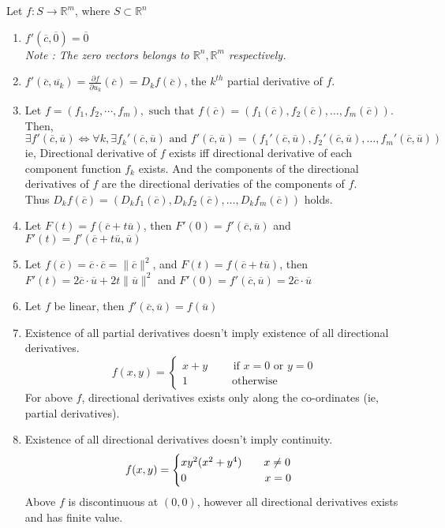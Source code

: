 \begin{remark}[Properties] Let \(f : S \to \mathbb{R}^m \), where \( S \subset \mathbb{R}^n\)
	\begin{enumerate}
		\item \( f'(\overline{c},\overline{0}) = \overline{0} \)\\
			\textsl{Note : The zero vectors belongs to $\mathbb{R}^n, \mathbb{R}^m$ respectively.}
		\item \( f'(\overline{c},\overline{u_k}) = \frac{\partial f}{\partial u_k}(\overline{c}) = D_k f(\overline{c}) \), the $k^{th}$ partial derivative of $f$.
		\item Let \( f = (f_1, f_2, \cdots, f_m), \text{ such that } f(\overline{c}) = \left(f_1(\overline{c}),f_2(\overline{c}),\dotsc,f_m(\overline{c})\right) \). Then, 
			\[ \exists f'(\overline{c},\overline{u}) \iff \forall k, \exists f_k'(\overline{c},\overline{u}) \text{ and } f'(\overline{c},\overline{u}) = \left(f_1'(\overline{c},\overline{u}),f_2'(\overline{c},\overline{u}),\dotsc,f_m'(\overline{c},\overline{u})\right) \]
			ie, Directional derivative of $f$ exists iff directional derivative of each component function $f_k$ exists. And the components of the directional derivatives of $f$ are the directional derivaties of the components of $f$.\\
			Thus \( D_k f(\overline{c}) = \left(D_k f_1(\overline{c}),D_k f_2(\overline{c}),\dotsc,D_k f_m(\overline{c}) \right) \) holds.
		\item Let \( F(t) = f(\overline{c}+t\overline{u}) \), then \( F'(0) = f'(\overline{c},\overline{u}) \) and \( F'(t) = f'(\overline{c}+t\overline{u},\overline{u}) \)
		\item Let \( f(\overline{c}) = \overline{c}\cdot\overline{c} = \|\overline{c}\|^2 \), and \(F(t) = f(\overline{c}+t\overline{u}) \), then \( F'(t) = 2\overline{c}\cdot\overline{u}+2t\|\overline{u}\|^2 \) and \( F'(0) = f'(\overline{c},\overline{u}) = 2\overline{c}\cdot\overline{u} \)
		\item Let \(f\) be linear, then \( f'(\overline{c},\overline{u}) = f(\overline{u}) \)
		\item Existence of all partial derivatives doesn't imply existence of all directional derivatives.
			\[ f(x,y) = \begin{cases} x+y \qquad \text{ if } x = 0 \text{ or } y = 0 \\ 1 \qquad \qquad \text{otherwise} \end{cases} \]
			For above \(f\), directional derivatives exists only along the co\nobreakdash-ordinates (ie, partial derivatives).
		\item Existence of all directional derivatives doesn't imply continuity.
			\[ f(x,y) = \begin{cases} xy^2(x^2+y^4) \qquad x \ne 0 \\ 0 \hspace{2.5cm} x = 0 \end{cases} \]
				Above \(f\) is discontinuous at \((0,0)\), however all directional derivatives exists and has finite value.
	\end{enumerate}
\end{remark}

